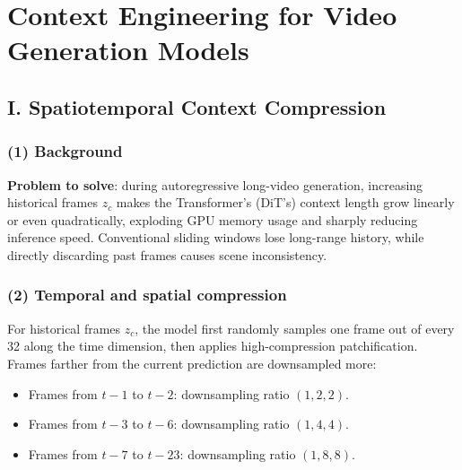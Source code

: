 \setcounter{section}{6}

\hypertarget{context-engineering-for-video-generation-models}{%
\section{Context Engineering for Video Generation Models}\label{context-engineering-for-video-generation-models}}

\hypertarget{i.-spatiotemporal-context-compression}{%
\subsection{I. Spatiotemporal Context Compression}\label{i.-spatiotemporal-context-compression}}

\hypertarget{background-3}{%
\subsubsection{(1) Background}\label{background-3}}

\textbf{Problem to solve}: during autoregressive long-video generation, increasing historical frames \(z_c\) makes the Transformer's (DiT's) context length grow linearly or even quadratically, exploding GPU memory usage and sharply reducing inference speed. Conventional sliding windows lose long-range history, while directly discarding past frames causes scene inconsistency.

\hypertarget{temporal-and-spatial-compression}{%
\subsubsection{(2) Temporal and spatial compression}\label{temporal-and-spatial-compression}}

For historical frames \(z_c\), the model first randomly samples one frame out of every 32 along the time dimension, then applies high-compression patchification. Frames farther from the current prediction are downsampled more:

\begin{itemize}
\tightlist
\item
  Frames from \(t-1\) to \(t-2\): downsampling ratio \((1,2,2)\).
\item
  Frames from \(t-3\) to \(t-6\): downsampling ratio \((1,4,4)\).
\item
  Frames from \(t-7\) to \(t-23\): downsampling ratio \((1,8,8)\).
\end{itemize}

